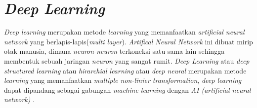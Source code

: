 \begin{table} [ht] \centering
  \caption{Nilai Mean Absolute Error Akurasi Mata Kuliah \citep{clustering}}
  \vspace*{2mm}
\end{table}

\section{\emph{Deep Learning}}
\emph{Deep learning} merupakan metode \emph{learning}
yang memanfaatkan \emph{artificial neural network} yang berlapis-lapis(\emph{multi layer}). \emph{Artifical Neural Network} ini dibuat mirip otak manusia, dimana \emph{neuron-neuron} terkoneksi
satu sama lain sehingga membentuk sebuah jaringan \emph{neuron} yang sangat rumit. \emph{Deep Learning} atau \emph{deep structured learning} atau \emph{hirarchial learning} atau \emph{deep neural} merupakan
metode \emph{learning} yang memanfaatkan \emph{multiple non-linier transformation}, \emph{deep learning} dapat dipandang sebagai gabungan \emph{machine learning} dengan \emph{AI (artificial neural network)} \citep{deepLearning}.

